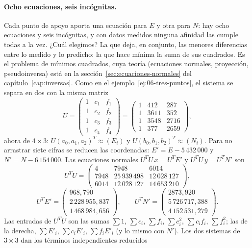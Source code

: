 \paragraph{Ocho ecuaciones, seis incógnitas.} Cada punto de apoyo aporta una ecuación para
\(E\) y otra para \(N\): hay ocho ecuaciones y seis incógnitas, y con datos medidos ninguna
afinidad las cumple todas a la vez. ¿Cuál elegimos? La que deja, en conjunto, las menores
diferencias entre lo medido y lo predicho: la que hace mínima la suma de sus cuadrados. Es el
problema de mínimos cuadrados, cuya teoría (ecuaciones normales,
proyección, pseudoinversa) está en la sección~\ref{sec:ecuaciones-normales} del
capítulo~\ref{cap:inversas}. Como en el ejemplo~\ref{ej:06-tres-puntos}, el sistema se separa
en dos con la misma matriz
\[
  U=\begin{pmatrix}1&c_1&f_1\\1&c_2&f_2\\1&c_3&f_3\\1&c_4&f_4\end{pmatrix}
   =\begin{pmatrix}1&412&287\\1&3611&352\\1&3548&2716\\1&377&2659\end{pmatrix},
\]
ahora de \(4\times3\): \(U(a_0,a_1,a_2)^T\approx(E_i)\) y \(U(b_0,b_1,b_2)^T\approx(N_i)\). Para
no arrastrar siete cifras se reducen las coordenadas: \(E'=E-5\,432\,000\) y
\(N'=N-6\,154\,000\). Las ecuaciones normales \(U^TU\,x=U^TE'\) y \(U^TU\,y=U^TN'\) son
\[
  U^TU=\begin{pmatrix}
  4&7948&6014\\ 7948&25\,939\,498&12\,028\,127\\ 6014&12\,028\,127&14\,653\,210
  \end{pmatrix},
\]
\[
  U^TE'=\begin{pmatrix}968{,}790\\2\,228\,955{,}837\\1\,468\,984{,}656\end{pmatrix},
  \qquad
  U^TN'=\begin{pmatrix}2873{,}920\\5\,726\,717{,}388\\4\,152\,531{,}279\end{pmatrix}.
\]
Las entradas de \(U^TU\) son las sumas \(\sum1\), \(\sum c_i\), \(\sum f_i\), \(\sum c_i^2\),
\(\sum c_if_i\), \(\sum f_i^2\); las de la derecha, \(\sum E'_i\), \(\sum c_iE'_i\), \(\sum
f_iE'_i\) (y lo mismo con \(N'\)). Los dos sistemas de \(3\times3\) dan los términos independientes reducidos
